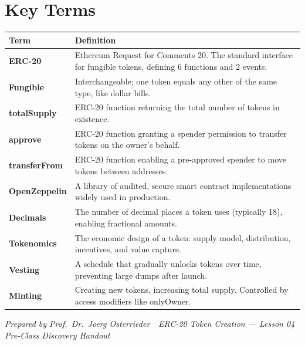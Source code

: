 \documentclass[11pt,a4paper]{article}
\begin{document}
\vspace{4pt}

\section{Key Terms}

\renewcommand{\arraystretch}{1.25}
\noindent\begin{tabular}{@{}p{2.8cm}p{11.8cm}@{}}
\toprule
\textbf{Term} & \textbf{Definition} \\
\midrule
\textbf{ERC-20}       & Ethereum Request for Comments 20. The standard interface for fungible tokens, defining 6 functions and 2 events. \\
\textbf{Fungible}     & Interchangeable; one token equals any other of the same type, like dollar bills. \\
\textbf{totalSupply}  & ERC-20 function returning the total number of tokens in existence. \\
\textbf{approve}      & ERC-20 function granting a spender permission to transfer tokens on the owner's behalf. \\
\textbf{transferFrom} & ERC-20 function enabling a pre-approved spender to move tokens between addresses. \\
\textbf{OpenZeppelin} & A library of audited, secure smart contract implementations widely used in production. \\
\textbf{Decimals}     & The number of decimal places a token uses (typically 18), enabling fractional amounts. \\
\textbf{Tokenomics}   & The economic design of a token: supply model, distribution, incentives, and value capture. \\
\textbf{Vesting}      & A schedule that gradually unlocks tokens over time, preventing large dumps after launch. \\
\textbf{Minting}      & Creating new tokens, increasing total supply. Controlled by access modifiers like {\ttfamily onlyOwner}. \\
\bottomrule
\end{tabular}

\vspace{6pt}
\noindent\textcolor{mlgray}{\small\textit{Prepared by Prof.\ Dr.\ Joerg Osterrieder \,\textbullet\, ERC-20 Token Creation --- Lesson 04 \,\textbullet\, Pre-Class Discovery Handout}}
\end{document}
